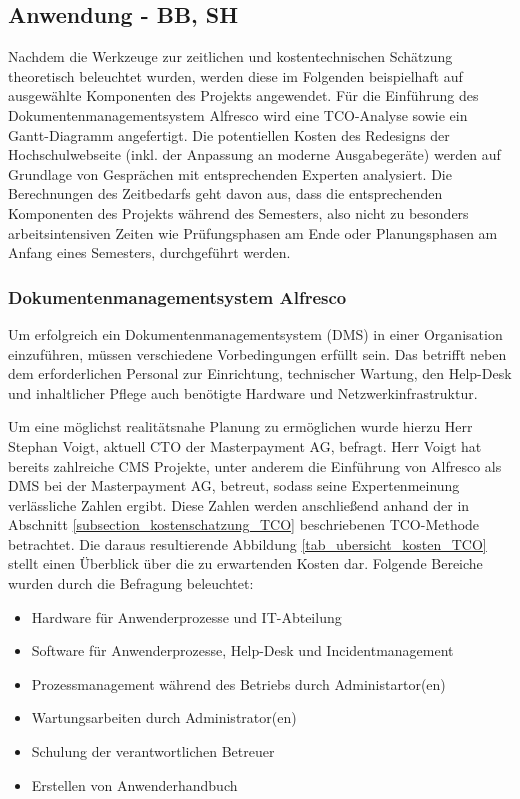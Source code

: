 
\subsection{Anwendung - BB, SH}
\label{kosten_zeit_anwendung} %
Nachdem die Werkzeuge zur zeitlichen und kostentechnischen Schätzung theoretisch beleuchtet wurden, werden diese im Folgenden beispielhaft auf ausgewählte Komponenten des Projekts angewendet. Für die Einführung des Dokumentenmanagementsystem Alfresco wird eine TCO-Analyse sowie ein Gantt-Diagramm angefertigt. Die potentiellen Kosten des Redesigns der Hochschulwebseite (inkl. der Anpassung  an moderne Ausgabegeräte) werden auf Grundlage von Gesprächen mit entsprechenden Experten analysiert. Die Berechnungen des Zeitbedarfs geht davon aus, dass die entsprechenden Komponenten des Projekts während des Semesters, also nicht zu besonders arbeitsintensiven Zeiten wie Prüfungsphasen am Ende oder Planungsphasen am Anfang eines Semesters, durchgeführt werden.

\subsubsection{Dokumentenmanagementsystem Alfresco}
\label{subsubsection_dokusystem_alfresco}
Um erfolgreich ein Dokumentenmanagementsystem (DMS) in einer Organisation einzuführen, müssen verschiedene Vorbedingungen erfüllt sein. Das betrifft neben dem erforderlichen Personal zur Einrichtung, technischer Wartung, den Help-Desk und inhaltlicher Pflege auch benötigte Hardware und Netzwerkinfrastruktur.

Um eine möglichst realitätsnahe Planung zu ermöglichen wurde hierzu Herr Stephan Voigt, aktuell CTO der Masterpayment AG, befragt. Herr Voigt hat bereits zahlreiche CMS Projekte, unter anderem die Einführung von Alfresco als DMS bei der Masterpayment AG, betreut, sodass seine Expertenmeinung verlässliche Zahlen ergibt. Diese Zahlen werden anschließend anhand der in Abschnitt \ref{subsection_kostenschatzung_TCO} beschriebenen TCO-Methode betrachtet. Die daraus resultierende Abbildung \ref{tab_ubersicht_kosten_TCO} stellt einen Überblick über die zu erwartenden Kosten dar. Folgende Bereiche wurden durch die Befragung beleuchtet:

\begin{itemize}
	\item Hardware für Anwenderprozesse und IT-Abteilung
	\item Software für Anwenderprozesse, Help-Desk und Incidentmanagement
	\item Prozessmanagement während des Betriebs durch Administartor(en)
	\item Wartungsarbeiten durch Administrator(en)
	\item Schulung der verantwortlichen Betreuer
	\item Erstellen von Anwenderhandbuch
\end{itemize}

